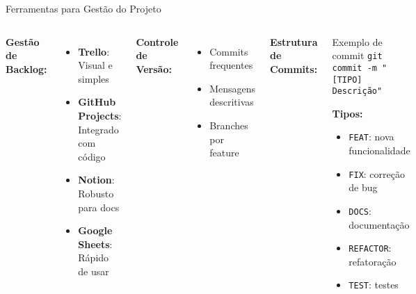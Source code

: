 \documentclass[10pt]{beamer}
\begin{document}
\begin{frame}{Ferramentas para Gestão do Projeto}
\begin{columns}[c]
\textbf{Gestão de Backlog:}
\begin{itemize}
    \item \textbf{Trello}: Visual e simples
    \item \textbf{GitHub Projects}: Integrado com código
    \item \textbf{Notion}: Robusto para docs
    \item \textbf{Google Sheets}: Rápido de usar
\end{itemize}

\textbf{Controle de Versão:}
\begin{itemize}
    \item Commits frequentes
    \item Mensagens descritivas
    \item Branches por feature
\end{itemize}

\textbf{Estrutura de Commits:}
\begin{block}{Exemplo de commit}
\texttt{git commit -m "[TIPO] Descrição"}

\vspace{0.2cm}
\textbf{Tipos:}
\begin{itemize}
    \item \texttt{FEAT}: nova funcionalidade
    \item \texttt{FIX}: correção de bug
    \item \texttt{DOCS}: documentação
    \item \texttt{REFACTOR}: refatoração
    \item \texttt{TEST}: testes
\end{itemize}
\end{block}
\end{columns}
\end{frame}
\end{document}
